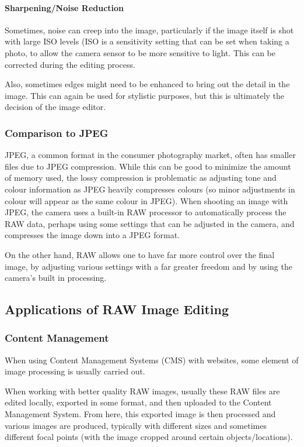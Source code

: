 \documentclass[11pt,a4paper]{article}
\begin{document}
\paragraph{Sharpening/Noise Reduction}
Sometimes, noise can creep into the image, particularly if the image itself is shot with large ISO levels (ISO is a sensitivity setting that can be
set when taking a photo, to allow the camera sensor to be more sensitive to light. This can be corrected
during the editing process. 

Also, sometimes edges might need to be enhanced to bring out the detail in the image. This can again be used for stylistic purposes, but this is ultimately the
decision of the image editor. 
 
\subsubsection{Comparison to JPEG}
JPEG, a common format in the consumer photography market, often has smaller files due to JPEG compression.
While this can be good to minimize the amount of memory used, the lossy compression is problematic as adjusting tone
and colour information as JPEG heavily compresses colours (so minor adjustments in colour will appear as the same colour in JPEG).
When shooting an image with JPEG, the camera uses a built-in RAW processor to automatically process the RAW data, perhaps using some settings
that can be adjusted in the camera, and compresses the image down into a JPEG format.

On the other hand, RAW allows one to have far more control over the final image, by adjusting various settings with a far greater freedom and by using the camera's
built in processing.

\cite{UnderstandingRAWCapture}

\subsection{Applications of RAW Image Editing}
\subsubsection{Content Management}
When using Content Management Systems (CMS) with websites, some element of image processing is usually carried out.

When working with better quality RAW images, usually these RAW files are edited locally, exported in some format, and then
uploaded to the Content Management System. From here, this exported image is then processed and various images are produced,
typically with different sizes and sometimes different focal points (with the image cropped around certain objects/locations).
\end{document}
